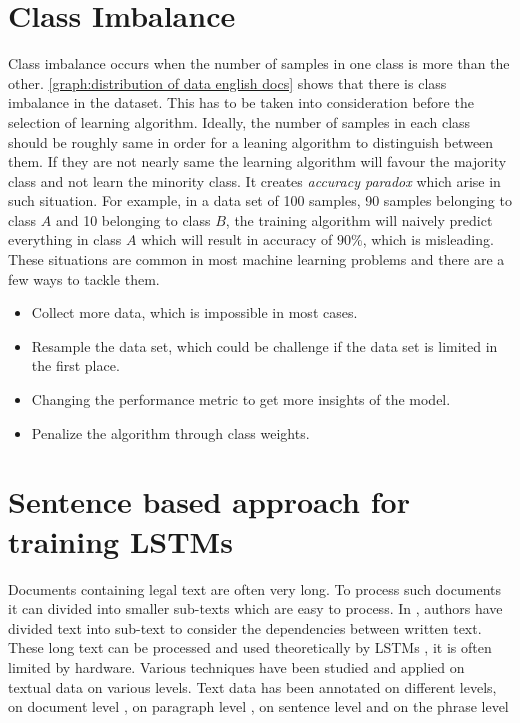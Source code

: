 \section{Class Imbalance}\label{backgroundImbalance}
Class imbalance occurs when the number of samples in one class is more than the other. \ref{graph:distribution of data english docs} shows that there is class imbalance in the dataset. This has to be taken into consideration before the selection of learning algorithm. Ideally, the number of samples in each class should be roughly same in order for a leaning algorithm to distinguish between them. If they are not nearly same the learning algorithm will favour the majority class and not learn the minority class. It creates \textit{accuracy paradox} which arise in such situation. For example, in a data set of 100 samples, 90 samples belonging to class $A$ and 10 belonging to class $B$, the training algorithm will naively predict everything in class $A$ which will result in accuracy of $90\%$, which is misleading. These situations are common in most machine learning problems and there are a few ways to tackle them. 


\begin{itemize}
  \item Collect more data, which is impossible in most cases.
  \item Resample the data set, which could be challenge if the data set is limited in the first place.
  \item Changing the performance metric to get more insights of the model.
  \item Penalize the algorithm through class weights.
\end{itemize}

\section{Sentence based approach for training LSTMs} \label{backgroundSlidingWindow}

Documents containing legal text are often very long. To process such documents it can divided into smaller sub-texts which are easy to process. In \cite{volkovich2016text}, authors have divided text into sub-text to consider the dependencies between written text. These long text can be processed and used theoretically by LSTMs \cite{hochreiter1997long} , it is often limited by hardware. Various techniques have been studied and applied on textual data on various levels. Text data has been annotated on different levels, on document level \cite{macdonald2006trec}, on paragraph level \cite{ferguson2009exploring}, on sentence level \cite{santos2009integrating, seki2008overview} and on the phrase level \cite{wilson2005recognizing}

